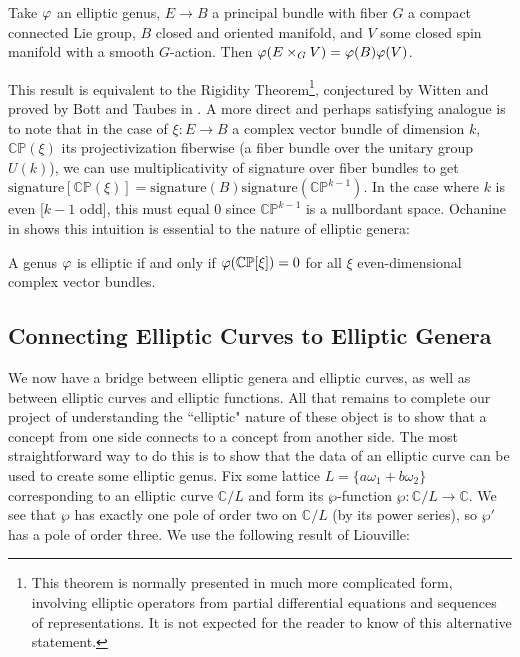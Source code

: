 \begin{theorem}
    Take $\varphi$ an elliptic genus, $E \to B$ a principal bundle with fiber $G$ a compact connected Lie group, $B$ closed and oriented manifold, and $V$ some closed spin manifold with a smooth $G$-action. Then $\varphi(E \times_G V) = \varphi(B) \varphi(V)$. 
\end{theorem}
This result is equivalent to the Rigidity Theorem\footnote{This theorem is normally presented in much more complicated form, involving elliptic operators from partial differential equations and sequences of representations. It is not expected for the reader to know of this alternative statement.}, conjectured by Witten and proved by Bott and Taubes in \cite{Bott_Taubes_1989}. A more direct and perhaps satisfying analogue is to note that in the case of $\xi: E \to B$ a complex vector bundle of dimension $k$, $\mathbb{CP}(\xi)$ its projectivization fiberwise (a fiber bundle over the unitary group $U(k)$), we can use multiplicativity of signature over fiber bundles to get $\text{signature} [\mathbb{CP}(\xi)] = \text{signature}(B) \text{signature}(\mathbb{CP}^{k-1})$. In the case where $k$ is even [$k - 1$ odd], this must equal $0$ since $\mathbb{CP}^{k-1}$ is a nullbordant space. Ochanine in \cite{Ochanine_1987} shows this intuition is essential to the nature of elliptic genera:

\begin{theorem}
    A genus $\varphi$ is elliptic if and only if $\varphi(\mathbb{CP}[\xi]) = 0$ for all $\xi$ even-dimensional complex vector bundles.
\end{theorem}


\subsection{Connecting Elliptic Curves to Elliptic Genera}

We now have a bridge between elliptic genera and elliptic curves, as well as between elliptic curves and elliptic functions. All that remains to complete our project of understanding the ``elliptic" nature of these object is to show that a concept from one side connects to a concept from another side. The most straightforward way to do this is to show that the data of an elliptic curve can be used to create some elliptic genus. Fix some lattice $L = \{a \omega_1 + b \omega_2 \}$ corresponding to an elliptic curve $\mathbb{C} / L$ and form its $\wp$-function $\wp: \mathbb{C} / L \to \mathbb{C}$. We see that $\wp$ has exactly one pole of order two on $\mathbb{C} / L$ (by its power series), so $\wp'$ has a pole of order three. We use the following result of Liouville:

